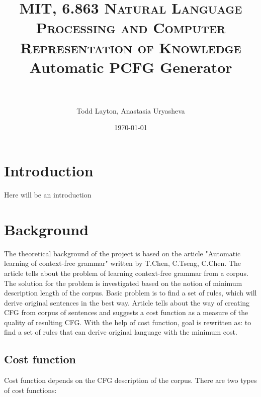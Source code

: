 \documentclass[paper=a4, fontsize=11pt]{scrartcl} %
\title{	
\normalfont \normalsize 
\textsc{MIT, 6.863 Natural Language Processing and Computer Representation of Knowledge}
\horrule{0.5pt} \\[0.4cm] %
\huge Automatic PCFG Generator \\ %
\horrule{2pt} \\[0.5cm] %
}
\author {Todd Layton, Anastasia Uryasheva}
\date{\normalsize\today}
\numberwithin{equation}{section} %
\numberwithin{figure}{section} %
\numberwithin{table}{section} %
\begin{document}
\maketitle %


\section{Introduction}

Here will be an introduction


\section{Background}

The theoretical background of the project is based on the article "Automatic learning of context-free grammar" written by T.Chen, C.Tseng, C.Chen. The article tells about the problem of learning context-free grammar from a corpus. The solution for the problem is investigated based on the notion of minimum description length of the corpus. 
Basic problem is to find a set of rules, which will derive original sentences in the best way. Article tells about the way of creating CFG from corpus of sentences and suggests a cost function as a measure of the quality of resulting CFG. With the help of cost function, goal is rewritten as: to find a set of rules that can derive original language with the minimum cost.

\subsection{Cost function}

Cost function depends on the CFG description of the corpus. There are two types of cost functions:
\end{document}
